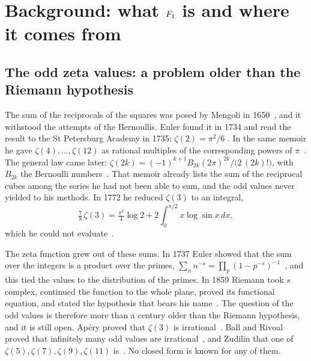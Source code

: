 \section{Background: what $F_1$ is and where it comes from}\label{sec:background}

\subsection{The odd zeta values: a problem older than the Riemann hypothesis}\label{sec:odd-history}

The sum of the reciprocals of the squares was posed by Mengoli in 1650~\cite{mengoli1650}, and it withstood the
attempts of the Bernoullis.  Euler found it in 1734 and read the result to the St Petersburg Academy in 1735:
$\zeta(2)=\pi^2/6$ .  In the same memoir he gave $\zeta(4),\dots,\zeta(12)$ as rational multiples of the
corresponding powers of $\pi$~\cite{euler1740}.  The general law came later:
$\zeta(2k)=(-1)^{k+1}B_{2k}(2\pi)^{2k}/\bigl(2\,(2k)!\bigr)$, with $B_{2k}$ the Bernoulli
numbers~\cite{lagarias13}.  That memoir already lists the sum of the reciprocal cubes among the series he had not
been able to sum, and the odd values never yielded to his methods.  In 1772 he reduced $\zeta(3)$ to an integral,
\[
  \tfrac78\,\zeta(3)=\tfrac{\pi^2}{4}\log2+2\int_0^{\pi/2}x\log\sin x\,dx,
\]
which he could not evaluate~\cite{euler1773,lagarias13}.

The zeta function grew out of these sums.  In 1737 Euler showed that the sum over the integers is a product over
the primes, $\sum_n n^{-s}=\prod_p(1-p^{-s})^{-1}$~\cite{euler1737}, and this tied the values to the distribution
of the primes.  In 1859 Riemann took $s$ complex, continued the function to the whole plane, proved its functional
equation, and stated the hypothesis that bears his name~\cite{riemann1859}.  The
question of the odd values is therefore more than a century older than the Riemann hypothesis, and it is still
open.  Ap\'ery proved that $\zeta(3)$ is irrational~\cite{apery79}.  Ball and Rivoal proved that infinitely many
odd values are irrational~\cite{ballrivoal01}, and Zudilin that one of $\zeta(5),\zeta(7),\zeta(9),\zeta(11)$
is~\cite{zudilin01}.  No closed form is known for any of them.

